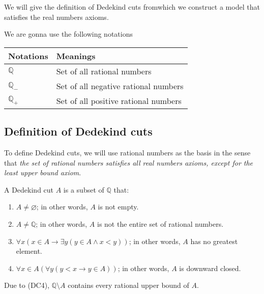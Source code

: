 \par We will give the definition of Dedekind cuts fromwhich we construct a model that satisfies the real numbers axioms.

\par We are gonna use the following notations
\begin{table}[htp]
    \centering
    \begin{tabular}{ll}
        Notations        & Meanings                             \\
        \bottomrule
        \toprule
        $\mathbb{Q}$     & Set of all rational numbers          \\
        $\mathbb{Q}_{-}$ & Set of all negative rational numbers \\
        $\mathbb{Q}_{+}$ & Set of all positive rational numbers
    \end{tabular}
\end{table}

\subsection{Definition of Dedekind cuts}

\par To define Dedekind cuts, we will use rational numbers as the basis in the sense that \textit{the set of rational numbers satisfies all real numbers axioms, except for the least upper bound axiom}.

\begin{definition}
    A Dedekind cut $A$ is a subset of $\mathbb{Q}$ that:
    \begin{enumerate}[label = (DC\arabic*)]
        \item $A\ne\varnothing$; in other words, $A$ is not empty.
        \item $A\neq\mathbb{Q}$; in other words, $A$ is not the entire set of rational numbers.
        \item $\forall x\left(x\in A \rightarrow \exists y \left( y\in A \wedge x < y \right)\right)$; in other words, $A$ has no greatest element.
        \item $\forall x\in A\left(\forall y( y < x \rightarrow y\in A)\right)$; in other words, $A$ is downward closed.
    \end{enumerate}
\end{definition}

\par Due to (DC4), $\mathbb{Q}\setminus A$ contains every rational upper bound of $A$.

